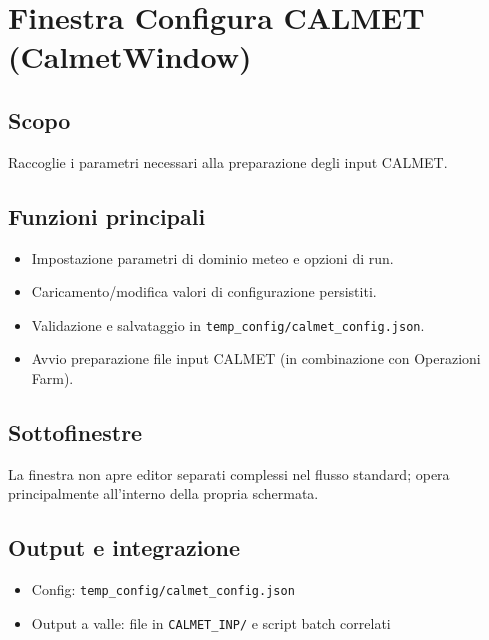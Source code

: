 \chapter{Finestra Configura CALMET (CalmetWindow)}

\section{Scopo}
Raccoglie i parametri necessari alla preparazione degli input CALMET.

\section{Funzioni principali}
\begin{itemize}[leftmargin=1.5em]
  \item Impostazione parametri di dominio meteo e opzioni di run.
  \item Caricamento/modifica valori di configurazione persistiti.
  \item Validazione e salvataggio in \texttt{temp\_config/calmet\_config.json}.
  \item Avvio preparazione file input CALMET (in combinazione con Operazioni Farm).
\end{itemize}

\section{Sottofinestre}
La finestra non apre editor separati complessi nel flusso standard; opera principalmente all'interno della propria schermata.

\section{Output e integrazione}
\begin{itemize}[leftmargin=1.5em]
  \item Config: \texttt{temp\_config/calmet\_config.json}
  \item Output a valle: file in \texttt{CALMET\_INP/} e script batch correlati
\end{itemize}

